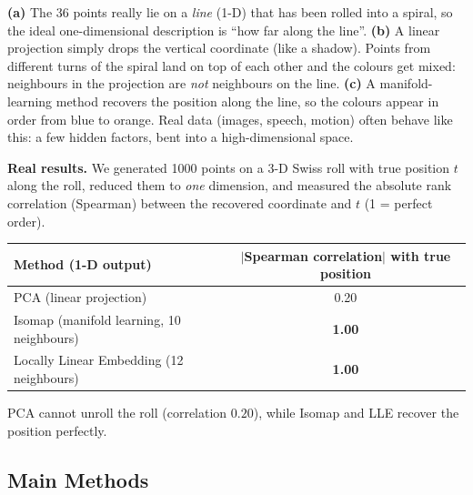 \begin{explain}
\textbf{(a)} The 36 points really lie on a \emph{line} (1-D) that has been rolled into a spiral, so the ideal one-dimensional description is ``how far along the line''. \textbf{(b)} A linear projection simply drops the vertical coordinate (like a shadow). Points from different turns of the spiral land on top of each other and the colours get mixed: neighbours in the projection are \emph{not} neighbours on the line. \textbf{(c)} A manifold-learning method recovers the position along the line, so the colours appear in order from blue to orange. Real data (images, speech, motion) often behave like this: a few hidden factors, bent into a high-dimensional space.
\end{explain}

\textbf{Real results.} We generated 1000 points on a 3-D Swiss roll with true position $t$ along the roll, reduced them to \emph{one} dimension, and measured the absolute rank correlation (Spearman) between the recovered coordinate and $t$ (1 = perfect order).

\begin{center}
\begin{tabular}{@{}lc@{}}
\toprule
\textbf{Method (1-D output)} & \textbf{$|$Spearman correlation$|$ with true position}\\
\midrule
PCA (linear projection) & 0.20\\
Isomap (manifold learning, 10 neighbours) & \textbf{1.00}\\
Locally Linear Embedding (12 neighbours) & \textbf{1.00}\\
\bottomrule
\end{tabular}
\end{center}

\noindent PCA cannot unroll the roll (correlation $0.20$), while Isomap and LLE recover the position perfectly.

\subsection{Main Methods}


